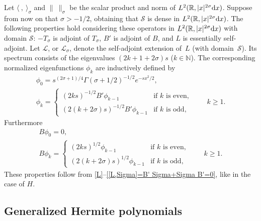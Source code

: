 \documentclass[pdftex]{sigma}
\newcommand{\R}{\mathbb{R}}
\newcommand{\N}{\mathbb{N}}
\newcommand{\LL}{\mathcal{L}}
\renewcommand{\SS}{\mathcal{S}}
\begin{document}
Let $\langle\ ,\ \rangle_\sigma$ and $\|\ \|_\sigma$ be the scalar product and norm of $L^2(\R,|x|^{2\sigma}{\rm d}x)$. Suppose from now on that $\sigma>-1/2$, obtaining that $\SS$ is dense in $L^2(\R,|x|^{2\sigma}{\rm d}x)$. The following properties hold considering these operators in $L^2(\R,|x|^{2\sigma}{\rm d}x)$ with domain $\SS$: $-T_\sigma$ is adjoint of $T_\sigma$, $B'$ is adjoint of $B$, and $L$ is essentially self-adjoint. Let $\LL$, or $\LL_\sigma$, denote the self-adjoint extension of~$L$ (with domain~$\SS$). Its spectrum consists of the eigenvalues $(2k+1+2\sigma)s$ ($k\in\N$). The corresponding normalized eigenfunctions $\phi_k$ are inductively def\/ined by
  \begin{gather}
    \phi_0 =s^{(2\sigma+1)/4}\Gamma(\sigma+1/2)^{-1/2}e^{-sx^2/2} ,\label{phi 0}\\
    \phi_k =
      \begin{cases}
        (2ks)^{-1/2}B'\phi_{k-1} & \text{if $k$ is even},\\
        (2(k+2\sigma)s)^{-1/2}B'\phi_{k-1} & \text{if $k$ is odd},
      \end{cases}
    \qquad k\ge1 .
    \label{phi k}
  \end{gather}
Furthermore
    \begin{gather}
      B\phi_0 =0 ,\label{B phi 0}\\
      B\phi_k =
        \begin{cases}
          (2ks)^{1/2}\phi_{k-1} & \text{if $k$ is even},\\
          (2(k+2\sigma)s)^{1/2}\phi_{k-1} & \text{if $k$ is odd},
        \end{cases}
      \qquad k\ge1 .
      \label{B phi k}
    \end{gather}
These properties follow from \eqref{L}--\eqref{[L,Sigma]=B' Sigma+Sigma B'=0}, like in the case of $H$.



\subsection{Generalized Hermite polynomials}\label{ss:p k}
\end{document}
